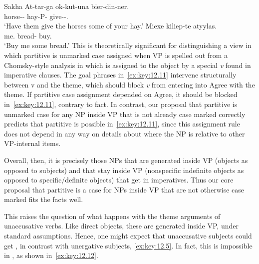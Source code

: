 \documentclass[output=paper]{langsci/langscibook}
\begin{document}
\ea\label{ex:key:12.11}Sakha
	\ea
		\gll At-tar-ga ok-kut-una bier-din-ner.\\
			horse-\Pl{}-\Dat{} hay-\Ssg{}P-\Part{} give-\Imp{}-\Tpl{}.\Sbj{}\\
		\glt ‘Have them give the horses some of your hay.’
	\ex
		\gll Miexe  kiliep-te atyylas.\\
			me.\Dat{}  bread-\Part{}  buy.\Imp{}\\
		\glt ‘Buy me some bread.’
	\z
\z
This is theoretically significant for distinguishing a view in which partitive
is unmarked case assigned when VP is spelled out from a Chomsky-style analysis
in which  is assigned to the object by a special \emph{v} found in
imperative clauses.  The goal phrases in~\eqref{ex:key:12.11} intervene structurally between v
and the theme, which should block \emph{v} from entering into Agree with the theme. If
partitive case assignment depended on Agree, it should be blocked in~\eqref{ex:key:12.11},
contrary to fact.  In contrast, our proposal that partitive is unmarked case
for any NP inside VP that is not already case marked correctly predicts that
partitive is possible in~\eqref{ex:key:12.11}, since this assignment rule does not depend in
any way on details about where the NP is relative to other VP-internal items.

Overall, then, it is precisely those NPs that are generated inside VP (objects
as opposed to subjects) and that stay inside VP (nonspecific indefinite objects
as opposed to specific/definite objects) that get  in
imperatives. Thus our core proposal that partitive is a case for NPs inside VP
that are not otherwise case marked fits the facts well.

This raises the question of what happens with the theme arguments of
unaccusative verbs.  Like direct objects, these are generated inside VP, under
standard assumptions.  Hence, one might expect that
unaccusative subjects could get , in
contrast with unergative subjects, \eqref{ex:key:12.5}. In
fact, this is impossible in , as shown in~\eqref{ex:key:12.12}.
\end{document}
